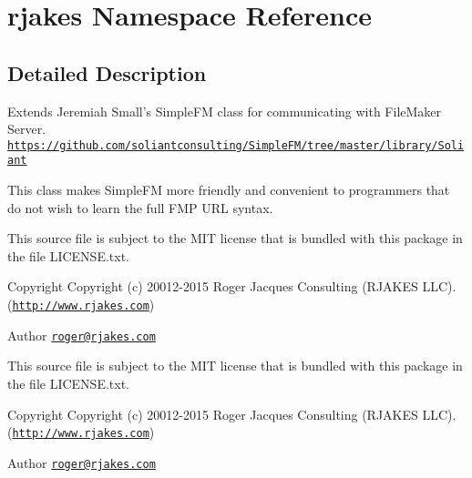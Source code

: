 \hypertarget{namespacerjakes}{\section{rjakes Namespace Reference}
\label{namespacerjakes}
}


\subsection{Detailed Description}
Extends Jeremiah Small's Simple\+F\+M class for communicating with File\+Maker Server. \href{https://github.com/soliantconsulting/SimpleFM/tree/master/library/Soliant}{\tt https\+://github.\+com/soliantconsulting/\+Simple\+F\+M/tree/master/library/\+Soliant}

This class makes Simple\+F\+M more friendly and convenient to programmers that do not wish to learn the full F\+M\+P U\+R\+L syntax.

This source file is subject to the M\+I\+T license that is bundled with this package in the file L\+I\+C\+E\+N\+S\+E.\+txt.

\begin{DoxyCopyright}{Copyright}
Copyright (c) 20012-\/2015 Roger Jacques Consulting (R\+J\+A\+K\+E\+S L\+L\+C). (\href{http://www.rjakes.com}{\tt http\+://www.\+rjakes.\+com}) 
\end{DoxyCopyright}
\begin{DoxyAuthor}{Author}
\href{mailto:roger@rjakes.com}{\tt roger@rjakes.\+com}
\end{DoxyAuthor}
This source file is subject to the M\+I\+T license that is bundled with this package in the file L\+I\+C\+E\+N\+S\+E.\+txt.

\begin{DoxyCopyright}{Copyright}
Copyright (c) 20012-\/2015 Roger Jacques Consulting (R\+J\+A\+K\+E\+S L\+L\+C). (\href{http://www.rjakes.com}{\tt http\+://www.\+rjakes.\+com}) 
\end{DoxyCopyright}
\begin{DoxyAuthor}{Author}
\href{mailto:roger@rjakes.com}{\tt roger@rjakes.\+com} 
\end{DoxyAuthor}

